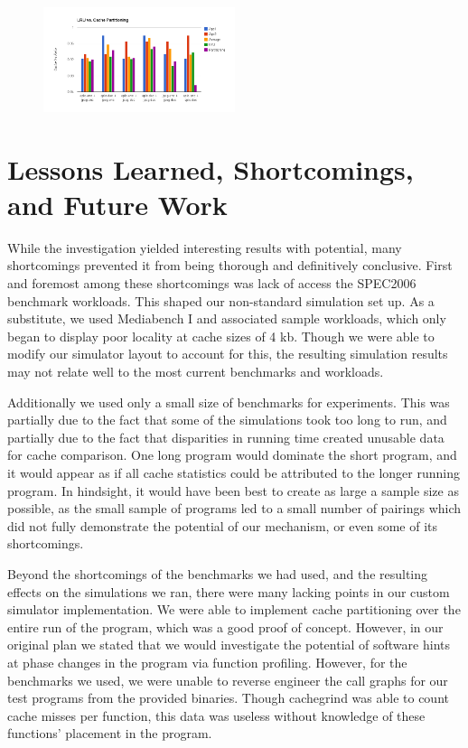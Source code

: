 \documentclass{acm_proc_article-sp}
\begin{document}
\begin{figure}
  \includegraphics[width=0.5\textwidth]{figs/work_set_size_hit_ratio.png}
\end{figure}

\section{Lessons Learned, Shortcomings, and Future Work}
 
While the investigation yielded interesting results with potential, many shortcomings prevented it from being thorough and definitively conclusive. First and foremost among these shortcomings was lack of access the SPEC2006 benchmark workloads. This shaped our non-standard simulation set up. As a substitute, we used Mediabench I and associated sample workloads, which only began to display poor locality at cache sizes of 4 kb. Though we were able to modify our simulator layout to account for this, the resulting simulation results may not relate well to the most current benchmarks and workloads.

Additionally we used only a small size of benchmarks for experiments. This was partially due to the fact that some of the simulations took too long to run, and partially due to the fact that disparities in running time created unusable data for
cache comparison. One long program would dominate the short program, and it would appear as if all cache statistics could be attributed to the longer running program. In hindsight, it would have been best to create as large a sample size
as possible, as the small sample of programs led to a small number of pairings which did not fully demonstrate the potential of our mechanism, or even some of its shortcomings.

Beyond the shortcomings of the benchmarks we had used, and the resulting effects on the simulations we ran, there were many lacking points in our custom simulator implementation. We were able to implement cache partitioning over the entire run of the program, which was a good proof of concept. However, in our original plan we stated that we would investigate the potential of software hints at phase changes in the program via function profiling. However, for the benchmarks we used, we were unable to reverse engineer the call graphs for our test programs from the provided binaries. Though cachegrind was able to count cache misses per function, this data was useless without knowledge of these functions’ placement in the program.
 
\end{document}
